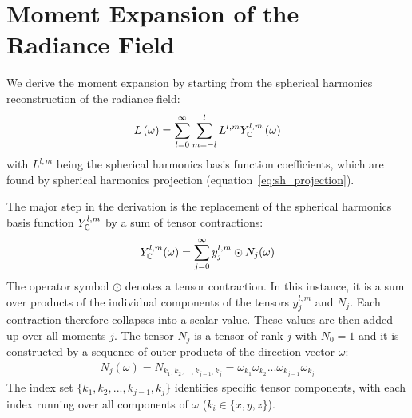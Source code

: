 \section{Moment Expansion of the Radiance Field}


We derive the moment expansion by starting from the spherical harmonics reconstruction of the radiance field:
\begin{align}
\label{eq:fld_moment_expansion_sh_expansion}
L\left(\omega\right) =
\sum_{l=0}^{\infty}\sum_{m=-l}^{l}L^{l,m}Y_{\mathbb{C}}^{l,m}
\left(\omega\right)
\end{align}
with $L^{l,m}$ being the spherical harmonics basis function coefficients, which are found by spherical harmonics projection (equation~\ref{eq:sh_projection}).

The major step in the derivation is the replacement of the spherical harmonics basis function $Y_{\mathbb{C}}^{l,m}$ by a sum of tensor contractions:
\begin{align}
\label{eq:fld_moment_expansion_sum}
Y_{\mathbb{C}}^{l,m}(\omega) =
\sum_{j=0}^\infty{y^{l,m}_j\odot N_j(\omega)}
\end{align}
The operator symbol $\odot$ denotes a tensor contraction. In this instance, it is a sum over products of the individual components of the tensors $y^{l,m}_j$ and $N_j$. Each contraction therefore collapses into a scalar value. These values are then added up over all moments $j$. The tensor $N_j$ is a tensor of rank $j$ with $N_0=1$ and it is constructed by a sequence of outer products of the direction vector $\omega$:
\begin{align}
N_j\left(\omega\right)
=N_{k_1, k_2, ..., k_{j-1}, k_j} 
=\omega_{k_1}\omega_{k_2}...\omega_{k_{j-1}}\omega_{k_j} 
\end{align}
The index set $\{k_1, k_2, ..., k_{j-1}, k_j\}$ identifies specific tensor components, with each index running over all components of $\omega$ ($k_i \in \{x, y, z\}$).

